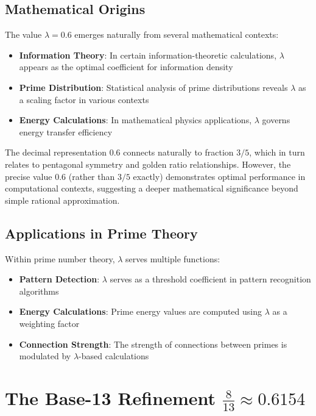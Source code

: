 \documentclass[12pt,a4paper]{report}
\newcommand{\base十三refined}{\frac{8}{13}}
\begin{document}
\subsection{Mathematical Origins}

The value $\lambda = 0.6$ emerges naturally from several mathematical contexts:

\begin{itemize}
\item \textbf{Information Theory}: In certain information-theoretic calculations, $\lambda$ appears as the optimal coefficient for information density
\item \textbf{Prime Distribution}: Statistical analysis of prime distributions reveals $\lambda$ as a scaling factor in various contexts
\item \textbf{Energy Calculations}: In mathematical physics applications, $\lambda$ governs energy transfer efficiency
\end{itemize}

The decimal representation $0.6$ connects naturally to fraction $3/5$, which in turn relates to pentagonal symmetry and golden ratio relationships. However, the precise value $0.6$ (rather than $3/5$ exactly) demonstrates optimal performance in computational contexts, suggesting a deeper mathematical significance beyond simple rational approximation.

\subsection{Applications in Prime Theory}

Within prime number theory, $\lambda$ serves multiple functions:

\begin{itemize}
\item \textbf{Pattern Detection}: $\lambda$ serves as a threshold coefficient in pattern recognition algorithms
\item \textbf{Energy Calculations}: Prime energy values are computed using $\lambda$ as a weighting factor
\item \textbf{Connection Strength}: The strength of connections between primes is modulated by $\lambda$-based calculations
\end{itemize}

\section{The Base-13 Refinement $\base十三refined \approx 0.6154$}
\end{document}

